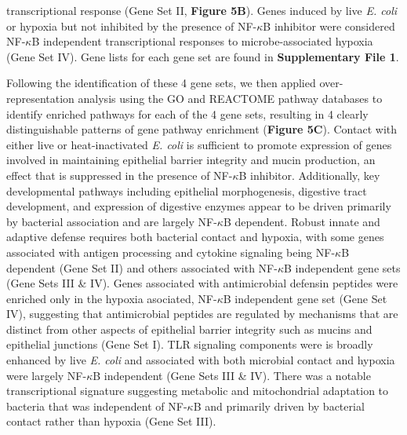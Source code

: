 \documentclass[9pt,lineo]{elife}
\begin{document}
transcriptional response (Gene Set II, \textbf{Figure 5B}). Genes induced by live \emph{E. coli} or hypoxia but not inhibited by the presence of NF-\(\kappa\)B inhibitor were considered NF-\(\kappa\)B independent transcriptional responses to microbe-associated hypoxia (Gene Set IV). Gene lists for each gene set are found in \textbf{Supplementary File 1}.

Following the identification of these 4 gene sets, we then applied over-representation analysis using the GO and REACTOME pathway databases to identify enriched pathways for each of the 4 gene sets, resulting in 4 clearly distinguishable patterns of gene pathway enrichment (\textbf{Figure 5C}). Contact with either live or heat-inactivated \emph{E. coli} is sufficient to promote expression of genes involved in maintaining epithelial barrier integrity and mucin production, an effect that is suppressed in the presence of NF-\(\kappa\)B inhibitor. Additionally, key developmental pathways including epithelial morphogenesis, digestive tract development, and expression of digestive enzymes appear to be driven primarily by bacterial association and are largely NF-\(\kappa\)B dependent. Robust innate and adaptive defense requires both bacterial contact and hypoxia, with some genes associated with antigen processing and cytokine signaling being NF-\(\kappa\)B dependent (Gene Set II) and others associated with NF-\(\kappa\)B independent gene sets (Gene Sets III \& IV). Genes associated with antimicrobial defensin peptides were enriched only in the hypoxia asociated, NF-\(\kappa\)B independent gene set (Gene Set IV), suggesting that antimicrobial peptides are regulated by mechanisms that are distinct from other aspects of epithelial barrier integrity such as mucins and epithelial junctions (Gene Set I). TLR signaling components were is broadly enhanced by live \emph{E. coli} and associated with both microbial contact and hypoxia were largely NF-\(\kappa\)B independent (Gene Sets III \& IV). There was a notable transcriptional signature suggesting metabolic and mitochondrial adaptation to bacteria that was independent of NF-\(\kappa\)B and primarily driven by bacterial contact rather than hypoxia (Gene Set III).
\end{document}
